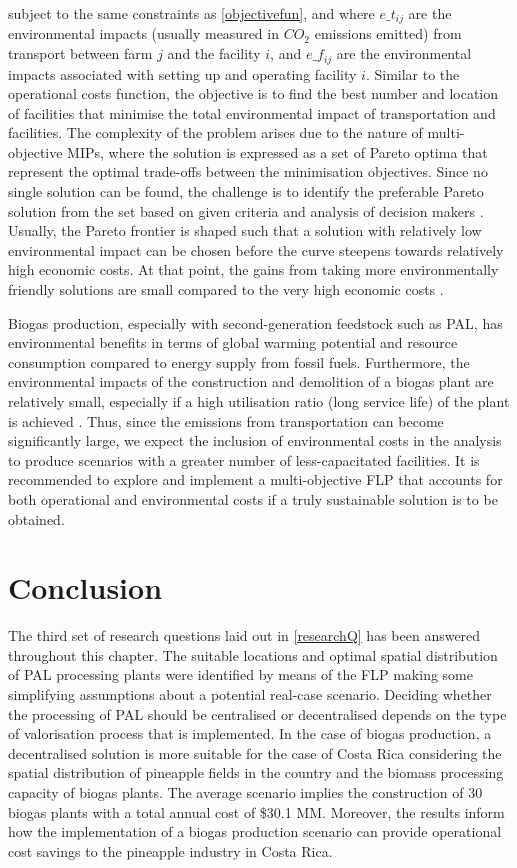 subject to the same constraints as \cref{objectivefun}, and where $e\_t_{ij}$ are the environmental impacts (usually measured in $CO_2$ emissions emitted) from transport between farm $j$ and the facility $i$, and $e\_f_{ij}$ are the environmental impacts associated with setting up and operating facility $i$. Similar to the operational costs function, the objective is to find the best number and location of facilities that minimise the total environmental impact of transportation and facilities. The complexity of the problem arises due to the nature of multi-objective MIPs, where the solution is expressed as a set of Pareto optima that represent the optimal trade-offs between the minimisation objectives. Since no single solution can be found, the challenge is to identify the preferable Pareto solution from the set based on given criteria and analysis of decision makers \cite{limleamthong2018combined}. Usually, the Pareto frontier is shaped such that a solution with relatively low environmental impact can be chosen before the curve steepens towards relatively high economic costs. At that point, the gains from taking more environmentally friendly solutions are small compared to the very high economic costs \cite{harris2009multi}.

Biogas production, especially with second-generation feedstock such as PAL, has environmental benefits in terms of global warming potential and resource consumption compared to energy supply from fossil fuels. Furthermore, the environmental impacts of the construction and demolition of a biogas plant are relatively small, especially if a high utilisation ratio (long service life) of the plant is achieved \cite{hijazi2016review}. Thus, since the emissions from transportation can become significantly large, we expect the inclusion of environmental costs in the analysis to produce scenarios with a greater number of less-capacitated facilities. It is recommended to explore and implement a multi-objective FLP that accounts for both operational and environmental costs if a truly sustainable solution is to be obtained. 

\section{Conclusion}

The third set of research questions laid out in \cref{researchQ} has been answered throughout this chapter. The suitable locations and optimal spatial distribution of PAL processing plants were identified by means of the FLP making some simplifying assumptions about a potential real-case scenario. Deciding whether the processing of PAL should be centralised or decentralised depends on the type of valorisation process that is implemented. In the case of biogas production, a decentralised solution is more suitable for the case of Costa Rica considering the spatial distribution of pineapple fields in the country and the biomass processing capacity of biogas plants. The average scenario implies the construction of 30 biogas plants with a total annual cost of \$30.1 MM. Moreover, the results inform how the implementation of a biogas production scenario can provide operational cost savings to the pineapple industry in Costa Rica. 


